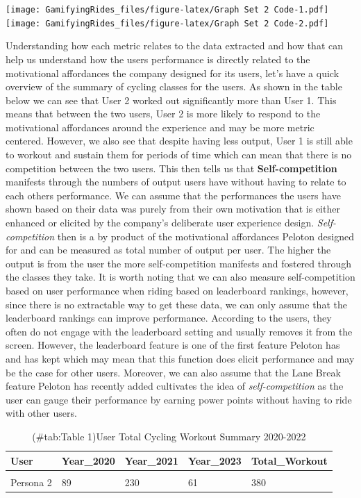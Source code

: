 \documentclass[
]{article}
\begin{document}
\texttt{[image: GamifyingRides\_files/figure-latex/Graph Set 2 Code-1.pdf]} \texttt{[image: GamifyingRides\_files/figure-latex/Graph Set 2 Code-2.pdf]}

Understanding how each metric relates to the data extracted and how that can help us understand how the users performance is directly related to the motivational affordances the company designed for its users, let's have a quick overview of the summary of cycling classes for the users. As shown in the table below we can see that User 2 worked out significantly more than User 1. This means that between the two users, User 2 is more likely to respond to the motivational affordances around the experience and may be more metric centered. However, we also see that despite having less output, User 1 is still able to workout and sustain them for periods of time which can mean that there is no competition between the two users. This then tells us that \textbf{Self-competition} manifests through the numbers of output users have without having to relate to each others performance. We can assume that the performances the users have shown based on their data was purely from their own motivation that is either enhanced or elicited by the company's deliberate user experience design. \emph{Self-competition} then is a by product of the motivational affordances Peloton designed for and can be measured as total number of output per user. The higher the output is from the user the more self-competition manifests and fostered through the classes they take. It is worth noting that we can also measure self-competition based on user performance when riding based on leaderboard rankings, however, since there is no extractable way to get these data, we can only assume that the leaderboard rankings can improve performance. According to the users, they often do not engage with the leaderboard setting and usually removes it from the screen. However, the leaderboard feature is one of the first feature Peloton has and has kept which may mean that this function does elicit performance and may be the case for other users. Moreover, we can also assume that the Lane Break feature Peloton has recently added cultivates the idea of \emph{self-competition} as the user can gauge their performance by earning power points without having to ride with other users.

\begin{table}[!h]

\caption{(\#tab:Table 1)User Total Cycling Workout Summary 2020-2022}
\centering
\begin{tabular}[t]{lllll}
\toprule
User & Year\_2020 & Year\_2021 & Year\_2023 & Total\_Workout\\
\midrule
\cellcolor{gray!6}{Persona 1} & \cellcolor{gray!6}{25} & \cellcolor{gray!6}{122} & \cellcolor{gray!6}{30} & \cellcolor{gray!6}{177}\\
Persona 2 & 89 & 230 & 61 & 380\\
\bottomrule
\end{tabular}
\end{table}
\newpage
\end{document}
